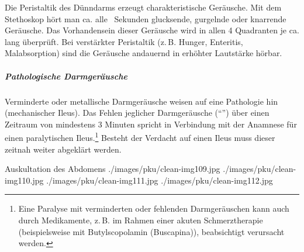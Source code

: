 {Die Peristaltik des Dünndarms erzeugt charakteristische Geräusche.
Mit dem Stethoskop hört man ca. alle ~Sekunden
glucksende, gurgelnde oder knarrende Geräusche. Das Vorhandensein dieser
Geräusche wird in allen 4 Quadranten je ca. 
lang überprüft. Bei verstärkter Peristaltik (z.\,B. Hunger, Enteritis,
Malabsorption) sind die Geräusche andauernd in erhöhter
Lautstärke hörbar.


\subparagraph{Pathologische Darmgeräusche} Verminderte oder
metallische Darmgeräusche weisen auf eine Pathologie hin (mechanischer Ileus). 
Das Fehlen jeglicher
Darmgeräusche (\enquote{}) über einen Zeitraum von
mindestens 3 Minuten spricht in Verbindung mit der
Anamnese für einen paralytischen Ileus.\footnote{Eine Paralyse mit verminderten oder
fehlenden Darmgeräuschen kann auch durch Medikamente,
z.\,B. im Rahmen einer akuten Schmerztherapie
(beispielsweise mit Butylscopolamin
(Buscapina{\texttrademark})), beabsichtigt verursacht
werden.} Besteht der Verdacht auf einen Ileus muss
dieser zeitnah weiter abgeklärt werden.

}
{\begin{PkuBefunde}[]
  \item[\SymbolPkuNormal] 
  \item[\SymbolPkuVariante] 
  
  \item[\SymbolPkuPathologisch] 
  
\end{PkuBefunde}}
{}
{}
{}


\begin{PictureSeries}{}{Auskultation des Abdomens}
{./images/pku/clean-img109.jpg}
{}
{./images/pku/clean-img110.jpg}
{}
{}
{}
{}
{}
{./images/pku/clean-img111.jpg}
{}
{./images/pku/clean-img112.jpg}
{}
{}
{}
{}
{}
\end{PictureSeries}




